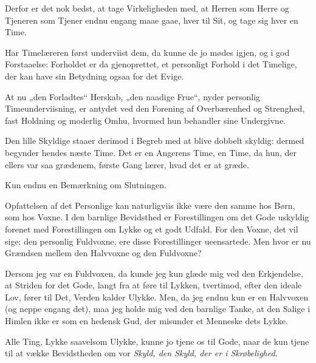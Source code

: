 \documentclass[12pt,a4paper]{book}
\newcommand{\apage}[1]{\marginnote{\footnotesize\textit{[#1]}}}
\begin{document}
Derfor er det nok bedst, at tage Virkeligheden med, at Herren som Herre
og Tjeneren som Tjener endnu engang maae gaae, hver til Sit, og tage sig
hver en Time.

Har Timelæreren først underviist dem, da kunne de jo mødes igjen, og i
god Forstaaelse: Forholdet er da gjenoprettet, et personligt Forhold i
det Timelige, der kan have sin Betydning ogsaa for det Evige.

At nu „den Forladtes“ Herskab, „den naadige Frue“, nyder personlig
Timeunderviisning, er antydet ved den Forening af Overbærenhed og
Strenghed, fast Holdning og moderlig Omhu, hvormed hun behandler sine
Undergivne.

Den lille Skyldige staaer derimod i Begreb med at blive dobbelt skyldig:
dermed begynder hendes næste Time. Det er en Angerens Time, en Time, da
hun, der ellers var saa grædenem, første Gang lærer, hvad det er at
græde.

Kun endnu en Bemærkning om Slutningen.

Opfattelsen af det Personlige kan naturligviis ikke være den samme hos
Børn, som hos Voxne. I den barnlige
 \apage{104}Bevidsthed er Forestillingen om det Gode uskyldig forenet med
Forestillingen om Lykke og et godt Udfald. For den Voxne, det vil sige:
den personlig Fuldvoxne, ere disse Forestillinger ueensartede. Men hvor
er nu Grændsen mellem den Halvvoxne og den Fuldvoxne?

Dersom jeg var en Fuldvoxen, da kunde jeg kun glæde mig ved den
Erkjendelse, at Striden for det Gode, langt fra at føre til Lykken,
tvertimod, efter den ideale Lov, fører til Det, Verden kalder Ulykke.
Men, da jeg endnu kun er en Halvvoxen (og neppe engang det), maa jeg
holde mig ved den barnlige Tanke, at den Salige i Himlen ikke er som en
hedensk Gud, der misunder et Menneske dets Lykke.

Alle Ting, Lykke saavelsom Ulykke, kunne jo tjene os til Gode, naar de
kun tjene til at vække Bevidstheden om vor \emph{Skyld, den Skyld, der er
i Skrøbelighed}.

\end{document}
